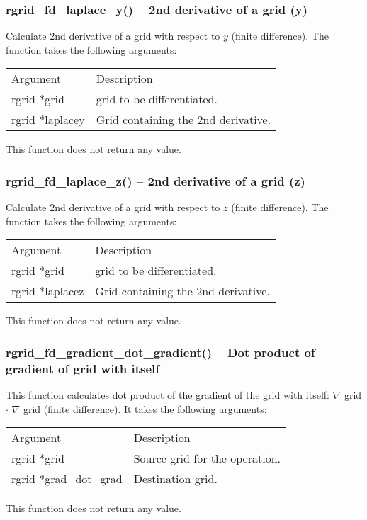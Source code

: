 \documentclass[12pt,letterpaper]{article}
\begin{document}
\subsubsection{rgrid\_fd\_laplace\_y() -- 2nd derivative of a grid (y)}

Calculate 2nd derivative of a grid with respect to $y$ (finite difference). The function takes the following arguments:
\begin{longtable}{p{} p{}}
Argument & Description\\
\cline{1-2}
rgrid *grid & grid to be differentiated.\\
rgrid *laplacey & Grid containing the 2nd derivative.\\
\end{longtable}
\noindent
This function does not return any value.

\subsubsection{rgrid\_fd\_laplace\_z() -- 2nd derivative of a grid (z)}

Calculate 2nd derivative of a grid with respect to $z$ (finite difference). The function takes the following arguments:
\begin{longtable}{p{} p{}}
Argument & Description\\
\cline{1-2}
rgrid *grid & grid to be differentiated.\\
rgrid *laplacez & Grid containing the 2nd derivative.\\
\end{longtable}
\noindent
This function does not return any value.

\subsubsection{rgrid\_fd\_gradient\_dot\_gradient() -- Dot product of gradient of grid with itself}

This function calculates dot product of the gradient of the grid with itself: $\nabla$ grid $\cdot$ $\nabla$ grid (finite difference). It takes the following arguments:
\begin{longtable}{p{} p{}}
Argument & Description\\
\cline{1-2}
rgrid *grid  & Source grid for the operation.\\
rgrid *grad\_dot\_grad & Destination grid.\\
\end{longtable}
\noindent
This function does not return any value.
\end{document}
